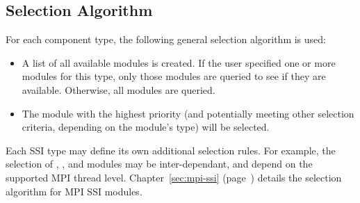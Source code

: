 
\subsection{Selection Algorithm}

For each component type, the following general selection algorithm is
used:

\begin{itemize}
\item A list of all available modules is created.  If the user
  specified one or more modules for this type, only those modules are
  queried to see if they are available.  Otherwise, all modules are
  queried.
  
\item The module with the highest priority (and potentially meeting
  other selection criteria, depending on the module's type) will be
  selected.
\end{itemize}

Each SSI type may define its own additional selection rules.  For
example, the selection of , , and 
modules may be inter-dependant, and depend on the supported MPI thread
level.  Chapter~\ref{sec:mpi-ssi} (page~\pageref{sec:mpi-ssi}) details
the selection algorithm for MPI SSI modules.

